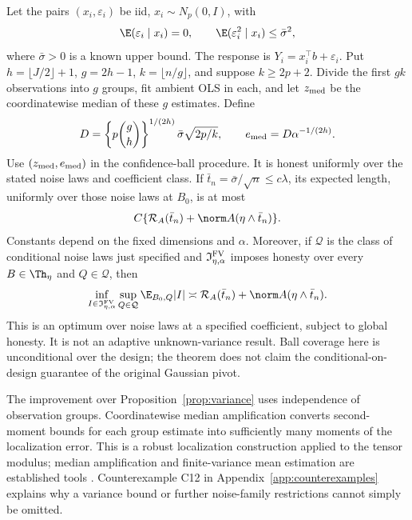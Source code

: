 \begin{theorem}\label{thm:robust}
Let the pairs $(x_i,\varepsilon_i)$ be iid, $x_i\sim N_p(0,I)$, with
\[
 \E(\varepsilon_i\mid x_i)=0,\qquad
 \E(\varepsilon_i^2\mid x_i)\le\bar\sigma^2,
\]
where $\bar\sigma>0$ is a known upper bound. The response is $Y_i=x_i^\top b+\varepsilon_i$. Put $h=\lfloor J/2\rfloor+1$, $g=2h-1$, $k=\lfloor n/g\rfloor$, and suppose $k\ge2p+2$. Divide the first $gk$ observations into $g$ groups, fit ambient OLS in each, and let $z_{\rm med}$ be the coordinatewise median of these $g$ estimates. Define
\[
 D=\left\{p\binom gh\right\}^{1/(2h)}
                \bar\sigma\sqrt{2p/k},\qquad
 e_{\rm med}=D\alpha^{-1/(2h)}.
\]
Use $(z_{\rm med},e_{\rm med})$ in the confidence-ball procedure. It is honest uniformly over the stated noise laws and coefficient class. If $\bar t_n=\bar\sigma/\sqrt n\le c\lambda$, its expected length, uniformly over those noise laws at $B_0$, is at most
\[
 C\{\mathcal R_A(\bar t_n)+\norm A(\eta\wedge\bar t_n)\}.
\]
Constants depend on the fixed dimensions and $\alpha$. Moreover, if $\mathcal Q$ is the class of conditional noise laws just specified and $\mathfrak I^{\rm FV}_{\eta,\alpha}$ imposes honesty over every $B\in\Th_\eta$ and $Q\in\mathcal Q$, then
\[
 \inf_{I\in\mathfrak I^{\rm FV}_{\eta,\alpha}}
       \sup_{Q\in\mathcal Q}\E_{B_0,Q}|I|
 \asymp\mathcal R_A(\bar t_n)+\norm A(\eta\wedge\bar t_n).
\]
This is an optimum over noise laws at a specified coefficient, subject to global honesty. It is not an adaptive unknown-variance result. Ball coverage here is unconditional over the design; the theorem does not claim the conditional-on-design guarantee of the original Gaussian pivot.
\end{theorem}
The improvement over Proposition~\ref{prop:variance} uses independence of observation groups. Coordinatewise median amplification converts second-moment bounds for each group estimate into sufficiently many moments of the localization error. This is a robust localization construction applied to the tensor modulus; median amplification and finite-variance mean estimation are established tools \citep{devroye2016,lugosi2019}. Counterexample C12 in Appendix~\ref{app:counterexamples} explains why a variance bound or further noise-family restrictions cannot simply be omitted.
